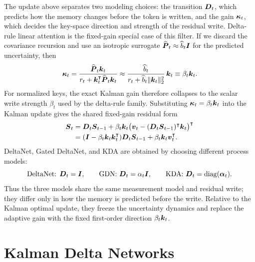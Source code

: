 \documentclass[11pt,letterpaper,logo]{yalearxiv}
\begin{document}
The update above separates two modeling choices: the transition $\boldsymbol{D}_t$, which predicts how
the memory changes before the token is written, and the gain $\boldsymbol{\kappa}_t$, which decides the
key-space direction and strength of the residual write. Delta-rule linear attention is the
fixed-gain special case of this filter. If we discard the covariance recursion and use an
isotropic surrogate $\widehat{\boldsymbol{P}}_t\approx \widehat b_t \boldsymbol{I}$ for the predicted uncertainty, then
\begin{equation}
  \boldsymbol{\kappa}_t
  =
  \frac{\widehat{\boldsymbol{P}}_t \boldsymbol{k}_t}{r_t+\boldsymbol{k}_t^{\intercal}\widehat{\boldsymbol{P}}_t \boldsymbol{k}_t}
  \approx
  \frac{\widehat b_t}{r_t+\widehat b_t\|\boldsymbol{k}_t\|_2^2}\,\boldsymbol{k}_t
  \equiv
  \beta_t \boldsymbol{k}_t .
  \label{eq:fixed-gain-approx}
\end{equation}
For normalized keys, the exact Kalman gain therefore collapses to the scalar write strength
$\beta_t$ used by the delta-rule family. Substituting $\boldsymbol{\kappa}_t=\beta_t \boldsymbol{k}_t$ into the
Kalman update gives the shared fixed-gain residual form
\begin{equation}
\begin{aligned}
  \boldsymbol{S}_t
  &= \boldsymbol{D}_t \boldsymbol{S}_{t-1}
     + \beta_t \boldsymbol{k}_t
     \big(\boldsymbol{v}_t-(\boldsymbol{D}_t\boldsymbol{S}_{t-1})^{\intercal}\boldsymbol{k}_t\big)^{\intercal} \\
  &= (\boldsymbol{I}-\beta_t \boldsymbol{k}_t \boldsymbol{k}_t^{\intercal})\boldsymbol{D}_t\boldsymbol{S}_{t-1}
     + \beta_t \boldsymbol{k}_t \boldsymbol{v}_t^{\intercal}.
\end{aligned}
\label{eq:fixed-gain-delta-family}
\end{equation}
DeltaNet, Gated DeltaNet, and KDA are obtained by choosing different process models:
\begin{equation}
  \text{DeltaNet: }\boldsymbol{D}_t=\boldsymbol{I},\qquad
  \text{GDN: }\boldsymbol{D}_t=\alpha_t \boldsymbol{I},\qquad
  \text{KDA: }\boldsymbol{D}_t=\operatorname{diag}(\boldsymbol{\alpha}_t).
  \label{eq:delta-family-transitions}
\end{equation}
Thus the three models share the same measurement model and residual write; they differ only
in how the memory is predicted before the write. Relative to the Kalman optimal update, they
freeze the uncertainty dynamics and replace the adaptive gain with the fixed first-order
direction $\beta_t \boldsymbol{k}_t$.


\section{Kalman Delta Networks}
\label{sec:kla}
\end{document}
